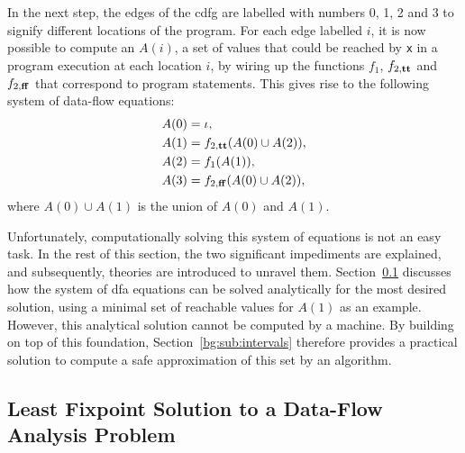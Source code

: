 In the next step, the edges of the \gls{cdfg} are labelled with numbers 0, 1,
2 and 3 to signify different locations of the program.  For each edge labelled
$i$, it is now possible to compute an $A(i)$, a set of values that could be
reached by \verb|x| in a program execution at each location $i$, by wiring up
the functions $f_1$, $f_{2, \mathbf{tt}}$ and $f_{2, \mathbf{ff}}$ that correspond
to program statements.  This gives rise to the following system of data-flow
equations:
\begin{align}
    A(0) &= \iota,
        \label{bg:eq:dfa0} \\
    A(1) &= f_{2, \mathbf{tt}}(A(0) \cup A(2)),
        \label{bg:eq:dfa1} \\
    A(2) &= f_1(A(1)),
        \label{bg:eq:dfa2} \\
    A(3) &= f_{2, \mathbf{ff}}(A(0) \cup A(2)),
        \label{bg:eq:dfa3}
\end{align}
where $A(0) \cup A(1)$ is the union of $A(0)$ and $A(1)$.

Unfortunately, computationally solving this system of equations is not an
easy task.  In the rest of this section, the two significant impediments
are explained, and subsequently, theories are introduced to unravel them.
Section~\ref{bg:sub:lfp} discusses how the system of \gls{dfa} equations can
be solved analytically for the most desired solution, using a minimal set of
reachable values for $A(1)$ as an example.  However, this analytical solution
cannot be computed by a machine.  By building on top of this foundation,
Section~\ref{bg:sub:intervals} therefore provides a practical solution to
compute a safe approximation of this set by an algorithm.


\subsection{Least Fixpoint Solution to a Data-Flow Analysis Problem}
\label{bg:sub:lfp}

